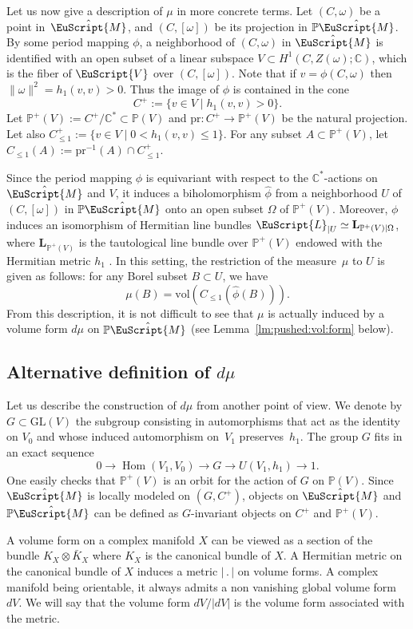\documentclass[10pt]{amsart}
\let\mathcal\EuScript
\DeclareMathOperator{\Hom}{Hom}
\theoremstyle{plain}
\theoremstyle{definition}
\def\C{\mathbb{C}}
\newcommand{\Pb}{\mathbb{P}}
\newcommand{\Lb}{\mathbf{L}}
\newcommand{\cL}{\mathcal{L}}
\newcommand{\cM}{\mathcal{M}}
\newcommand{\cV}{\mathcal{V}}
\newcommand{\GL}{\mathrm{GL}}
\newcommand{\vol}{\mathrm{vol}}
\newcommand{\pr}{\mathrm{pr}}
\let\omg\omega
\begin{document}
Let us now give a description of $\mu$ in more concrete terms.
Let $(C,\omega)$ be a point in~$\hat{\cM}$, and $(C,[\omg])$ be its projection in $\Pb\hat{\cM}$.
By some period mapping $\phi$, a neighborhood of $(C,\omg)$ in $\hat{\cM}$ is identified with an open subset of a linear subspace $V \subset H^1(C,Z(\omg);\C)$, which is the fiber of $\cV$ over $(C,[\omega])$.
Note that if $v=\phi(C,\omg)$ then $\|\omg\|^2=h_1(v,v) >0$. Thus the image of $\phi$ is contained in the cone
\[
C^+:=\{v\in V\mid h_1(v,v)>0\}.
\]
Let $\Pb^+(V):= C^+/\C^* \subset\Pb(V)$ and $\pr : C^+ \to \Pb^+(V) $ be the natural projection.
Let also $C^+_{\leq 1} := \{ v \in V \mid 0 < h_1(v,v) \leq 1 \}$.
For any subset $A\subset \Pb^+(V)$, let $C_{\leq 1}(A):=\pr^{-1}(A)\cap C^+_{\leq 1}$.

Since the period mapping $\phi$ is equivariant with respect to the $\C^*$-actions on $\hat{\cM}$ and $V$, it induces a biholomorphism $\hat{\phi}$ from a neighborhood $U$ of $(C,[\omg])$ in $\Pb\hat{\cM}$ onto an open subset $\Omega$ of $\Pb^+(V)$.
Moreover, $\phi$ induces an isomorphism of Hermitian line bundles $\cL_{|U}\simeq \Lb_{\Pb^+(V)|\Omega}$, where $\Lb_{\Pb^+(V)}$ is the tautological line bundle over $\Pb^+(V)$ endowed with the Hermitian metric $h_1$ .
In this setting, the restriction of the measure~$\mu$ to $U$ is given as follows: for any Borel subset $B\subset U$, we have
\[ \mu(B)=\vol(C_{\leq 1}(\hat{\phi}(B))). \]
From this description, it is not difficult to see that $\mu$ is actually induced by a volume form $d\mu$ on $\Pb\hat\cM$ (see Lemma~\ref{lm:pushed:vol:form} below).

\subsection{Alternative definition of $d\mu$}\label{sec:defvolform}
Let us describe the construction of $d\mu$ from another point of view.
We denote by $G \subset \GL(V)$ the subgroup consisting in automorphisms that act as the identity on $V_0$ and whose induced automorphism on~$V_1$ preserves~$h_1$.
The group $G$ fits in an exact sequence
\[
0 \to \Hom(V_1, V_0) \to G \to U(V_1, h_1) \to 1.
\]
One easily checks that $\Pb^+(V) $ is an orbit for the action of $G$ on $\Pb(V)$.
Since $\hat\cM$ is locally modeled on $(G,C^+)$, objects on $\hat\cM$ and $\Pb\hat\cM$ can be defined as $G$-invariant objects on $C^+$ and $\Pb^+(V)$.

A volume form on a complex manifold $X$ can be viewed as a section of the bundle $K_X\otimes\bar K_X$ where $K_X$ is the canonical bundle of $X$. A Hermitian metric on the canonical bundle of $X$ induces a metric $|\,.\,|$ on volume forms. A complex manifold being orientable, it always admits a non vanishing global volume form $dV$. We will say that the volume form $dV/|dV|$ is the volume form associated with the metric.
\end{document}
